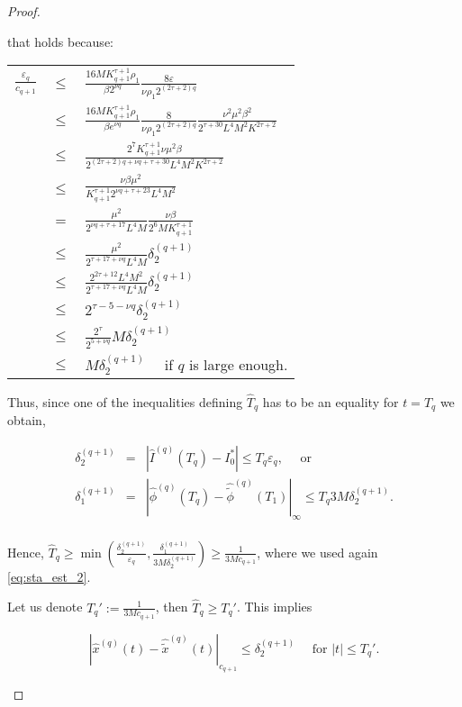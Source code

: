 \begin{proof}
\begin{enumerate}
that holds because:

\begin{longtable}{rcl}
$\frac{\varepsilon_q}{c_{q+1}}$ & $\leq$ & $\frac{16 M K_{q+1}^{\tau+1} \rho_1}{\beta 2^{\nu q}}\frac{8 \varepsilon}{\nu \rho_1 2^{(2\tau+2)q}}$ \\
 & $\leq$ & $\frac{16 M K_{q+1}^{\tau+1}\rho_1}{\beta e^{\nu q}}\frac{8}{\nu\rho_1 2^{(2\tau+2)q}}\frac{\nu^2 \mu^2 \beta^2}{2^{\tau+30}L^4 M^2 K^{2\tau+2}}$ \\
 & $\leq$ & $\frac{2^7 K_{q+1}^{\tau+1}\nu\mu^2\beta}{2^{(2\tau+2)q + \nu q + \tau + 30} L^4 M^2 K^{2\tau+2}}$\\
 & $\leq$ & $\frac{\nu\beta\mu^2}{K_{q+1}^{\tau+1} 2^{\nu q + \tau + 23} L^4 M^2}$\\
 & $=$ & $\frac{\mu^2}{2^{\nu q + \tau + 17} L^4 M}\frac{\nu\beta}{2^6 M K_{q+1}^{\tau+1}}$\\
 & $\leq$ & $\frac{\mu^2}{2^{\tau+17+\nu q} L^4 M}\delta_2^{(q+1)}$\\
 & $\leq$ & $\frac{2^{2\tau+12}L^4 M^2}{2^{\tau+17+\nu q} L^4 M}\delta_2^{(q+1)}$\\
 & $\leq$ & $2^{\tau-5-\nu q} \delta_2^{(q+1)}$\\
 & $\leq$ & $\frac{2^\tau}{2^{5+\nu q}} M \delta_2^{(q+1)}$ \\
 & $\leq$ & $M \delta_2^{(q+1)}\quad $ if $q$ is large enough.\\
\end{longtable}

Thus, since one of the inequalities defining $\hat T_q$ has to be an equality for $t = T_q$ we obtain,

$$
\begin{array}{rcl}
\delta_2^{(q+1)} & = & |\hat I^{(q)}(T_q) - I_0^*| \leq T_q \varepsilon_q, \quad \text{ or}\\
\delta_1^{(q+1)} & = & |\hat \phi^{(q)}(T_q) - \hat{\tilde \phi}^{(q)}(T_1)|_\infty \leq T_q 3M\delta_2^{(q+1)}.\\
\end{array}
$$

Hence, $\hat T_q \geq \min(\frac{\delta_2^{(q+1)}}{\varepsilon_q},\frac{\delta_1^{(q+1)}}{3 M \delta_2^{(q+1)}}) \geq \frac{1}{3 M c_{q+1}}$, where we used again \ref{eq:sta_est_2}.

Let us denote $T_q' := \frac{1}{3 M c_{q+1}}$, then $\hat T_q \geq T_q'$. This implies

$$|\hat x^{(q)}(t) - \hat{\tilde x}^{(q)}(t)|_{c_{q+1}} \leq \delta_2^{(q+1)} \quad \text{ for }  |t| \leq T_q'.$$


\end{enumerate}
\end{proof}
